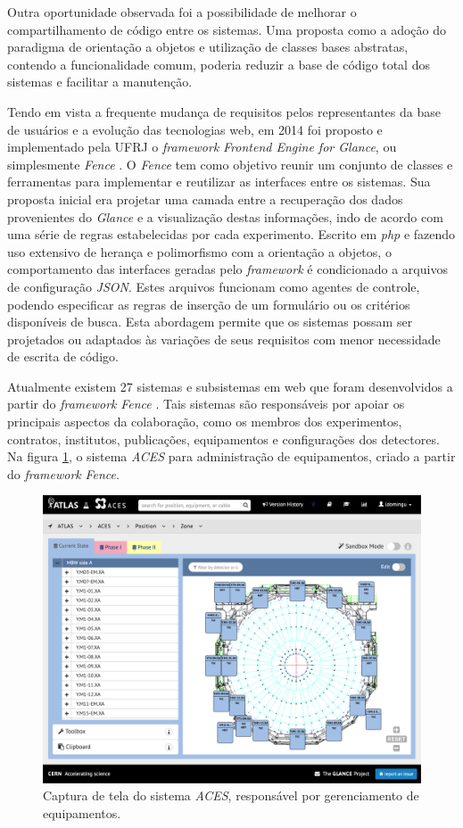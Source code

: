Outra oportunidade observada foi a possibilidade de melhorar o compartilhamento de código entre os sistemas. Uma proposta como a adoção do paradigma de orientação a objetos e utilização de classes bases abstratas, contendo a funcionalidade comum, poderia reduzir a base de código total dos sistemas e facilitar a manutenção.

Tendo em vista a frequente mudança de requisitos pelos representantes da base de usuários e a evolução das tecnologias web, em 2014 foi proposto e implementado pela UFRJ o \emph{framework} \emph{Frontend Engine for Glance}, ou simplesmente \emph{Fence} \cite{lange}. O \emph{Fence} tem como objetivo reunir um conjunto de classes e ferramentas para implementar e reutilizar as interfaces entre os sistemas. Sua proposta inicial era projetar uma camada entre a recuperação dos dados provenientes do \emph{Glance} e a visualização destas informações, indo de acordo com uma série de regras estabelecidas por cada experimento. Escrito em \emph{php} e fazendo uso extensivo de herança e polimorfismo com a orientação a objetos, o comportamento das interfaces geradas pelo \emph{framework} é condicionado a arquivos de configuração \emph{JSON}. Estes arquivos funcionam como agentes de controle, podendo especificar as regras de inserção de um formulário ou os critérios disponíveis de busca. Esta abordagem permite que os sistemas possam ser projetados ou adaptados às variações de seus requisitos com menor necessidade de escrita de código.

Atualmente existem 27 sistemas e subsistemas em web que foram desenvolvidos a partir do \emph{framework} \emph{Fence} \cite{fence}. Tais sistemas são responsáveis por apoiar os principais aspectos da colaboração, como os membros dos experimentos, contratos, institutos, publicações, equipamentos e configurações dos detectores. Na figura \ref{fig:aces-websystem}, o sistema \emph{ACES} para administração de equipamentos, criado a partir do \emph{framework} \emph{Fence}.

\begin{figure}[H]
    \centering
    \includegraphics[width=15cm]{source/2-contextualizacao/images/aces-websystem.png}
    \caption{Captura de tela do sistema \emph{ACES}, responsável por gerenciamento de equipamentos.}
    \label{fig:aces-websystem}
\end{figure}
